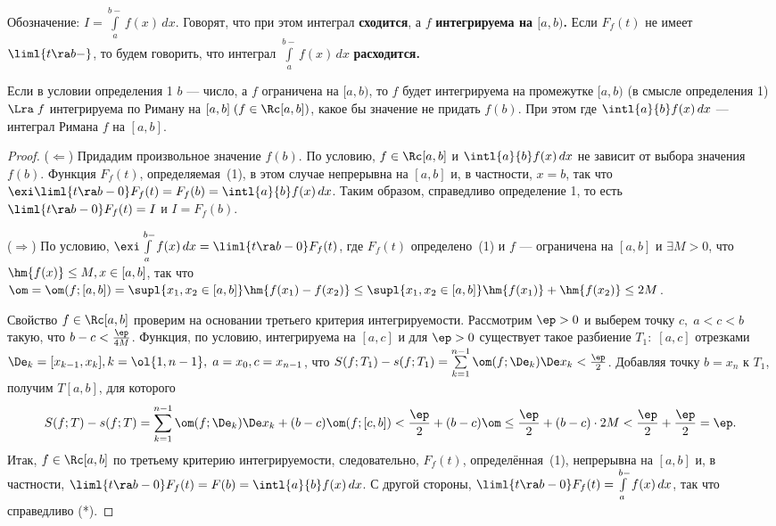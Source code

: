 \documentclass[a4paper]{article}
\begin{document}
Обозначение: $I=\int\limits_a^{b-} f(x)\,dx$. Говорят, что при этом
интеграл \textbf{сходится}, а $f$ \textbf{интегрируема на $[a,b)$.}
Если $F_f(t)$ не имеет $\liml{t\ra b-}$, то будем говорить,
что интеграл $\int\limits_a^{b-}f(x)\,dx$ \textbf{расходится.}

\begin{theorem}
Если в условии определения 1 $b$ --- число, а $f$ ограничена на
$[a,b)$, то $f$ будет интегрируема на промежутке $[a,b)$ (в смысле
определения 1) $\Lra\;f$ интегрируема по Риману на
$[a,b]\;(f\in\Rc[a,b])$, какое бы значение не придать $f(b)$. При
этом 
где $\intl{a}{b} f(x)\,dx$ --- интеграл Римана $f$ на $[a,b]$.
\end{theorem}

\begin{proof}
($\Leftarrow$) Придадим произвольное значение $f(b)$. По условию,
$f\in\Rc[a,b]$ и $\intl{a}{b} f(x)\,dx$ не зависит от выбора
значения $f(b)$. Функция $F_f(t)$, определяемая~(1), в этом случае
непрерывна на $[a,b]$ и, в частности, $x=b$, так что
$\exi \liml{t\ra b-0} F_f(t) = F_f(b) = \intl{a}{b}
f(x)\,dx$. Таким образом, справедливо определение 1, то есть
$\liml{t\ra b-0} F_f(t) = I$ и $I=F_f(b)$.

($\Rightarrow$) По условию, $\exi \int\limits_a^{b-} f(x)\,dx =
\liml{t\ra b-0} F_f(t)$, где $F_f(t)$ определено~(1) и $f$
--- ограничена на $[a,b]$ и $\exi M>0$, что $\hm{f(x)} \le M,
x\in[a,b]$, так что $\om=\om(f;[a,b]) = \supl{x_1,x_2 \in
[a,b]}\hm{f(x_1) - f(x_2)} \le \supl{x_1,x_2 \in [a,b]}
\hm{f(x_1)} + \hm{f(x_2)} \le 2M$.

Свойство $f\in\Rc[a,b]$ проверим на основании третьего критерия
интегрируемости. Рассмотрим $\ep>0$ и выберем точку $c,\;a<c<b$
такую, что $b-c < \frac{\ep}{4M}$. Функция, по условию, интегрируема
на $[a,c]$ и для $\ep>0$ существует такое разбиение $T_1:\;[a,c]$
отрезками $\De_k=[x_{k-1},x_k],k=\ol{1,n-1},\; a=x_0, c =
x_{n-1}$, что $S(f;T_1) - s(f;T_1) = \sum\limits_{k=1}^{n-1}
\om(f;\De_k) \De x_k < \frac{\ep}2$. Добавляя точку $b=x_n$ к
$T_1$, получим $T[a,b]$, для которого
$$S(f;T) - s(f;T) = \sum\limits_{k=1}^{n-1} \om(f;\De_k) \De x_k + (b-c) \om (f;[c,b])
< \frac{\ep}2 + (b-c)\om \le \frac{\ep}2 + (b-c) \cdot 2M < \frac{\ep}2 + \frac{\ep}2 = \ep.$$
Итак, $f\in\Rc[a,b]$ по третьему критерию интегрируемости, следовательно, $F_f(t)$, определённая~(1),
непрерывна на $[a,b]$ и, в частности, $\liml{t\ra b-0} F_f(t)
= F(b) = \intl{a}{b} f(x)\,dx$. С другой стороны,
$\liml{t \ra b-0} F_f(t) = \int\limits_a^{b-} f(x)\,dx$, так
что справедливо (*).
\end{proof}
\end{document}
